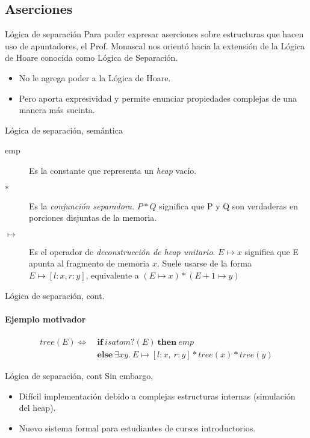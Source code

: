 \subsection*{Aserciones}
\begin{frame}{Lógica de separación}
Para poder expresar aserciones sobre estructuras que hacen uso de apuntadores, 
el Prof. Monascal nos orientó hacia la extensión de la Lógica de Hoare conocida 
como Lógica de Separación.

\begin{itemize}
  \item No le agrega poder a la Lógica de Hoare.
  \item Pero aporta expresividad y permite enunciar propiedades complejas de 
  una manera más sucinta.
 \end{itemize}
\end{frame}

\begin{frame}{Lógica de separación, semántica}

\begin{description}
  \item [emp] Es la constante que representa un \textit{heap} vacío. 
  \item [$*$] Es la \textit{conjunción separadora}. $P*Q$ significa que P y Q son verdaderas en porciones disjuntas de la memoria.
  \item [$\mapsto$] Es el operador de \textit{deconstrucción de heap unitario}. $E \mapsto x$ significa que E apunta al fragmento de memoria $x$. Suele usarse de la forma $E \mapsto [l : x, r : y]$, equivalente a $(E \mapsto x) * (E + 1 \mapsto y)$
\end{description}

\end{frame}

\begin{frame}{Lógica de separación, cont.}
\framesubtitle{Ejemplo motivador}

\begin{align*}
  tree(E) \Longleftrightarrow\ &\boldsymbol{if}\ isatom?(E)\ \boldsymbol{then}\ emp \\
             &\boldsymbol{else}\ \exists xy.\ E\mapsto[l: x,\ r: y] * tree(x) * tree(y) \nonumber
\end{align*}

\end{frame}

\begin{frame}{Lógica de separación, cont}
Sin embargo,
\begin{itemize}
  \item Difícil implementación debido a complejas estructuras internas (simulación del heap).
  \item Nuevo sistema formal para estudiantes de cursos introductorios. 
\end{itemize}
\end{frame}
